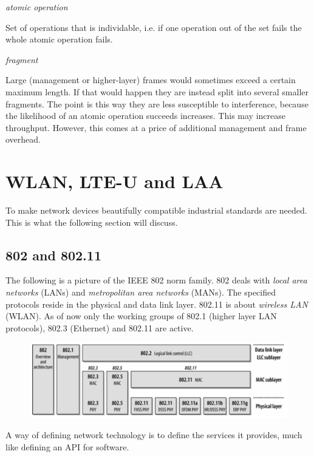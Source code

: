 \documentclass{article}
\begin{document}
	\bigskip
	
	\emph{atomic operation}
	
	Set of operations that is individable, i.e. if one operation out of the set fails the whole atomic operation fails.
		
	\bigskip
	
	\emph{fragment}
	
	Large (management or higher-layer) frames would sometimes exceed a certain maximum length. If that would happen they are instead split into several smaller fragments. The point is this way they are less susceptible to interference, because the likelihood of an atomic operation succeeds increases. This may increase throughput. However, this comes at a price of additional management and frame overhead. 
	
	\bigskip
	
	\section{WLAN, LTE-U and LAA}
	
	To make network devices beautifully compatible industrial standards are needed. This is what the following section will discuss.
		
	\subsection{802 and 802.11}
	
	The following is a picture of the IEEE 802 norm family. 802 deals with \emph{local area networks} (LANs) and \emph{metropolitan area networks} (MANs). The specified protocols reside in the physical and data link layer. 802.11 is about \emph{wireless LAN} (WLAN). As of now only the working groups of 802.1 (higher layer LAN protocols), 802.3 (Ethernet) and 802.11 are active.
	
	\begin{figure}[h] \label{802-tree}
		\includegraphics[width=\textwidth]{802-tree}
	\end{figure} 
	
	A way of defining network technology is to define the services it provides, much like defining an API for software.
	
\end{document}
